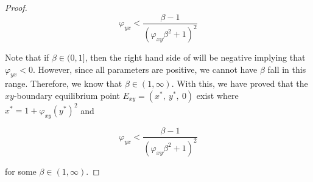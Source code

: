 \begin{proof}
    \begin{equation}\label{eq:xy-eq-condition}
        \varphi_{yx}<\frac{\beta-1}{\left(\varphi_{xy}\beta^2+1\right)^2}
    \end{equation}

    Note that if $\beta\in(0, 1]$, then the right hand side of  will be negative implying that $\varphi_{yx}<0$. However, since all parameters are positive, we cannot have $\beta$ fall in this range. Therefore, we know that $\beta\in\left(1,\infty\right)$. With this, we have proved that the $xy$-boundary equilibrium point $E_{xy}=\left(x^*,\ y^*,\ 0\right)$ exist where $x^*=1+\varphi_{xy}\left(y^*\right)^2$ and 
    
    \begin{equation*}
        \varphi_{yx}<\frac{\beta-1}{\left(\varphi_{xy}\beta^2+1\right)^2}
    \end{equation*}
    
    for some $\beta\in\left(1, \infty\right)$.
\end{proof}

